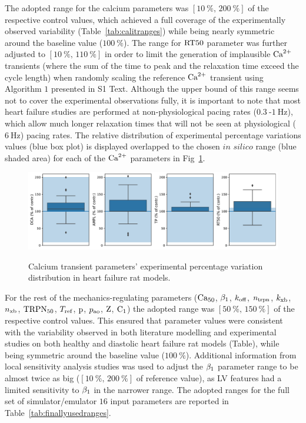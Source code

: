 \vspace{0.2cm}
The adopted range for the calcium parameters was $[\SI{10}{\percent},\,\SI{200}{\percent}]$ of the respective control values, which achieved a full coverage of the experimentally observed variability (Table~\ref{tab:calitranges}) while being nearly symmetric around the baseline value ($\SI{100}{\percent}$). The range for $\textrm{RT50}$ parameter was further adjusted to $[\SI{10}{\percent},\,\SI{110}{\percent}]$ in order to limit the generation of implausible $\textrm{Ca}^{2+}$ transients (where the sum of the time to peak and the relaxation time exceed the cycle length) when randomly scaling the reference $\textrm{Ca}^{2+}$ transient using Algorithm $1$ presented in S1 Text. Although the upper bound of this range seems not to cover the experimental observations fully, it is important to note that most heart failure studies are performed at non-physiological pacing rates ($\SI{0.3}{}$-$\SI{1}{\hertz}$), which allow much longer relaxation times that will not be seen at physiological ($\SI{6}{\hertz}$) pacing rates. The relative distribution of experimental percentage variations values (blue box plot) is displayed overlapped to the chosen $\textit{in silico}$ range (blue shaded area) for each of the $\textrm{Ca}^{2+}$ parameters in Fig~\ref{fig:calitdistr}.

\begin{figure}[ht!]
    \myfloatalign
    \caption{Calcium transient parameters' experimental percentage variation distribution in heart failure rat models.}
    \includegraphics[width=\textwidth]{figures/chapter07/ca_literature_review_all_studies.pdf}
    \label{fig:calitdistr}
\end{figure}

\vspace{0.2cm}
 For the rest of the mechanics-regulating parameters ($\textrm{Ca}_{50}$, $\beta_1$, $k_{\textrm{off}}$, $n_{\textrm{trpn}}$, $k_{\textrm{xb}}$, $n_{\textrm{xb}}$, $\textrm{TRPN}_{50}$, $T_{\textrm{ref}}$, $\textrm{p}$, $p_{\textrm{ao}}$, $\textrm{Z}$, $\textrm{C}_1$) the adopted range was $[\SI{50}{\percent},\,\SI{150}{\percent}]$ of the respective control values. This ensured that parameter values were consistent with the variability observed in both literature modelling and experimental studies on both healthy and diastolic heart failure rat models (Table), while being symmetric around the baseline value ($\SI{100}{\percent}$). Additional information from local sensitivity analysis studies was used to adjust the $\beta_1$ parameter range to be almost twice as big ($[\SI{10}{\percent},\,\SI{200}{\percent}]$ of reference value), as LV features had a limited sensitivity to $\beta_1$ in the narrower range. The adopted ranges for the full set of simulator/emulator $16$ input parameters are reported in Table~\ref{tab:finallyusedranges}.


